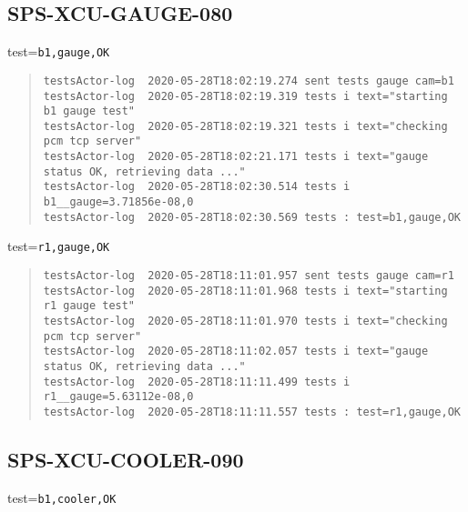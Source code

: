 \subsection{SPS-XCU-GAUGE-080}
\label{sec:tc-080}

test=\texttt{b1,gauge,OK}

\begin{quote}
\begin{tiny}
\begin{verbatim}
testsActor-log  2020-05-28T18:02:19.274 sent tests gauge cam=b1
testsActor-log  2020-05-28T18:02:19.319 tests i text="starting b1 gauge test"
testsActor-log  2020-05-28T18:02:19.321 tests i text="checking pcm tcp server"
testsActor-log  2020-05-28T18:02:21.171 tests i text="gauge status OK, retrieving data ..."
testsActor-log  2020-05-28T18:02:30.514 tests i b1__gauge=3.71856e-08,0
testsActor-log  2020-05-28T18:02:30.569 tests : test=b1,gauge,OK

\end{verbatim}
\end{tiny}
\end{quote}

\noindent test=\texttt{r1,gauge,OK}

\begin{quote}
\begin{tiny}
\begin{verbatim}
testsActor-log  2020-05-28T18:11:01.957 sent tests gauge cam=r1
testsActor-log  2020-05-28T18:11:01.968 tests i text="starting r1 gauge test"
testsActor-log  2020-05-28T18:11:01.970 tests i text="checking pcm tcp server"
testsActor-log  2020-05-28T18:11:02.057 tests i text="gauge status OK, retrieving data ..."
testsActor-log  2020-05-28T18:11:11.499 tests i r1__gauge=5.63112e-08,0
testsActor-log  2020-05-28T18:11:11.557 tests : test=r1,gauge,OK
\end{verbatim}
\end{tiny}
\end{quote}

\subsection{SPS-XCU-COOLER-090}
\label{sec:tc-090}

test=\texttt{b1,cooler,OK}

